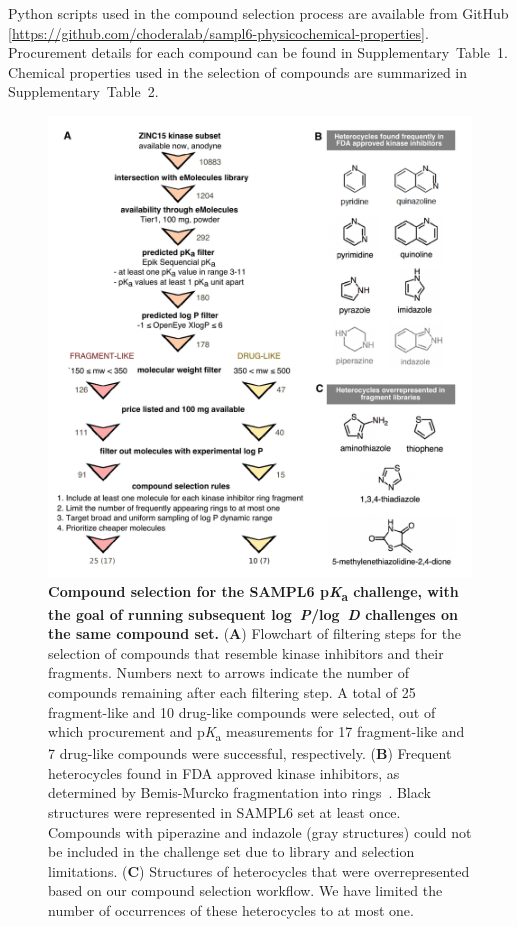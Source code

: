 \documentclass[9pt,lineno]{elife}
\newcommand{\pKa}{p\textit{K}\textsubscript{a}}
\newcommand{\logD}{log~\textit{D}}
\newcommand{\logP}{log~\textit{P}}
\begin{document}
Python scripts used in the compound selection process are available from GitHub [\url{https://github.com/choderalab/sampl6-physicochemical-properties}]. 
Procurement details for each compound can be found in Supplementary~Table~1. 
Chemical properties used in the selection of compounds are summarized in Supplementary~Table~2.

\begin{figure}
\begin{center}
\includegraphics[width=0.95\linewidth]{figures/compound_selection_figure.pdf}
\caption{{\bf Compound selection for the SAMPL6 \pKa{} challenge, with the goal of running subsequent \logP{}/\logD{} challenges on the same compound set.} 
(\textbf{A}) Flowchart of filtering steps for the selection of compounds that resemble kinase inhibitors and their fragments. 
Numbers next to arrows indicate the number of compounds remaining after each filtering step. 
A total of 25 fragment-like and 10 drug-like compounds were selected, out of which procurement and \pKa{} measurements for 17 fragment-like and 7 drug-like compounds were successful, respectively. 
(\textbf{B}) Frequent heterocycles found in FDA approved kinase inhibitors, as determined by Bemis-Murcko fragmentation into rings~\citep{bemis_properties_1996}. 
Black structures were represented in SAMPL6 set at least once. 
Compounds with piperazine and indazole (gray structures) could not be included in the challenge set due to library and selection limitations.  
(\textbf{C}) Structures of heterocycles that were overrepresented based on our compound selection workflow. 
We have limited the number of occurrences of these heterocycles to at most one.
}
\label{fig:compound_selection_figure}
\end{center}
\end{figure}
\end{document}
